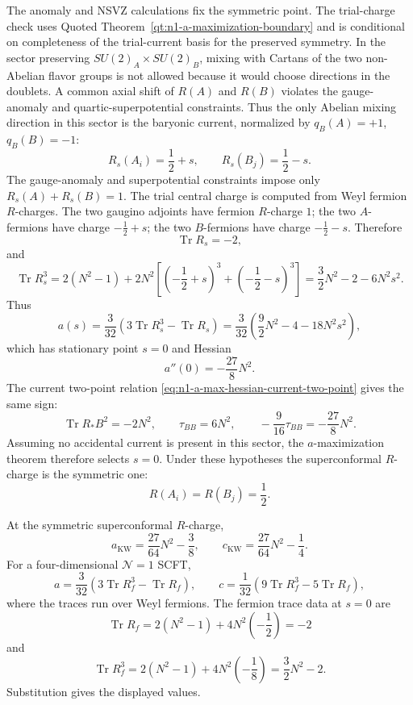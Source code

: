 The anomaly and NSVZ calculations fix the symmetric point.  The trial-charge
check uses Quoted Theorem~\ref{qt:n1-a-maximization-boundary} and is
conditional on completeness of the trial-current basis for the preserved
symmetry.  In the sector preserving
\(SU(2)_A\times SU(2)_B\), mixing with Cartans of the two non-Abelian flavor
groups is not allowed because it would choose directions in the doublets.  A
common axial shift of \(R(A)\) and \(R(B)\) violates the gauge-anomaly and
quartic-superpotential constraints.  Thus the only Abelian mixing direction in
this sector is the baryonic current, normalized by \(q_B(A)=+1\),
\(q_B(B)=-1\):
\[
  R_s(A_i)=\frac12+s,\qquad
  R_s(B_j)=\frac12-s .
\]
The gauge-anomaly and superpotential constraints impose only
\(R_s(A)+R_s(B)=1\).  The trial central charge is computed from Weyl fermion
\(R\)-charges.  The two gaugino adjoints have fermion \(R\)-charge \(1\);
the two \(A\)-fermions have charge \(-\frac12+s\); the two \(B\)-fermions
have charge \(-\frac12-s\).  Therefore
\[
  \operatorname{Tr}R_s=-2,
\]
and
\[
  \operatorname{Tr}R_s^3
  =
  2(N^2-1)
  +
  2N^2\left[
    \left(-\frac12+s\right)^3
    +
    \left(-\frac12-s\right)^3
  \right]
  =
  \frac32N^2-2-6N^2s^2 .
\]
Thus
\[
  a(s)
  =
  \frac{3}{32}
  \left(3\operatorname{Tr}R_s^3-\operatorname{Tr}R_s\right)
  =
  \frac{3}{32}
  \left(\frac92N^2-4-18N^2s^2\right),
\]
which has stationary point \(s=0\) and Hessian
\[
  a''(0)=-\frac{27}{8}N^2 .
\]
The current two-point relation
\eqref{eq:n1-a-max-hessian-current-two-point} gives the same sign:
\[
  \operatorname{Tr}R_\ast B^2=-2N^2,\qquad
  \tau_{BB}=6N^2,\qquad
  -\frac9{16}\tau_{BB}=-\frac{27}{8}N^2 .
\]
Assuming no accidental current is present in this sector, the
\(a\)-maximization theorem therefore selects \(s=0\).  Under these hypotheses
the superconformal \(R\)-charge is the symmetric one:
\[
  R(A_i)=R(B_j)=\frac12 .
\]

\begin{remark}
\label{rem:kw-central-charges}
At the symmetric superconformal \(R\)-charge,
\[
  a_{\mathrm{KW}}=\frac{27}{64}N^2-\frac38,\qquad
  c_{\mathrm{KW}}=\frac{27}{64}N^2-\frac14 .
\]
For a four-dimensional \(\mathcal N=1\) SCFT,
\[
  a=\frac{3}{32}(3\operatorname{Tr}R_f^3-\operatorname{Tr}R_f),
  \qquad
  c=\frac{1}{32}(9\operatorname{Tr}R_f^3-5\operatorname{Tr}R_f),
\]
where the traces run over Weyl fermions.  The fermion trace data at \(s=0\)
are
\[
  \operatorname{Tr}R_f
  =
  2(N^2-1)+4N^2\left(-\frac12\right)
  =
  -2
\]
and
\[
  \operatorname{Tr}R_f^3
  =
  2(N^2-1)+4N^2\left(-\frac18\right)
  =
  \frac32N^2-2 .
\]
Substitution gives the displayed values.
\end{remark}

